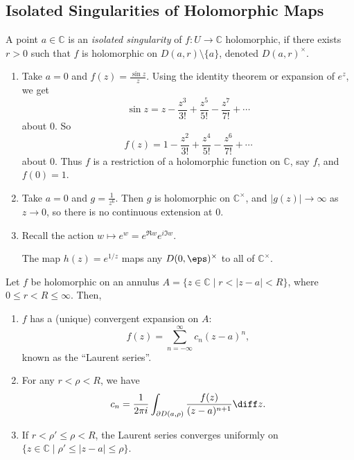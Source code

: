 \documentclass[12pt]{article}
\begin{document}
\subsection{Isolated Singularities of Holomorphic Maps}
\label{sub:isolated_singularities_of_holomorphic_maps}

\begin{definition}
	A point $a \in \mathbb{C}$ is an \emph{isolated singularity} of $f : U \to \mathbb{C}$ holomorphic, if there exists $r > 0$ such that $f$ is holomorphic on $D(a, r) \setminus \{a\}$, denoted $D(a, r)^{\times}$.
\end{definition}

\begin{exbox}
	\begin{enumerate}
		\item Take $a = 0$ and $f(z) = \frac{\sin z}{z}$. Using the identity theorem or expansion of $e^{z}$, we get
			\[
				\sin z = z - \frac{z^3}{3!} + \frac{z^{5}}{5!} - \frac{z^{7}}{7!} + \cdots
			\]
			about $0$. So
			\[
			f(z) = 1 - \frac{z^2}{3!} + \frac{z^4}{5!} - \frac{z^6}{7!} + \cdots
			\]
			about $0$. Thus $f$ is a restriction of a holomorphic function on $\mathbb{C}$, say $f$, and $f(0) = 1$.
		\item Take $a=  0$ and $g = \frac{1}{z^{6}}$. Then $g$ is holomorphic on $\mathbb{C}^{\times}$, and $|g(z)| \to \infty$ as $z \to 0$, so there is no continuous extension at $0$.
		\item Recall the action $w \mapsto e^{w} = e^{\Re w} e^{i \Im w}$.

			The map $h(z) = e^{1/z}$ maps any $D(0, \eps)^{\times}$ to all of $\mathbb{C}^\times$.
	\end{enumerate}
\end{exbox}


\begin{theorem}
	Let $f$ be holomorphic on an annulus $A = \{z \in \mathbb{C} \mid r < |z - a| < R\}$, where $0 \leq r < R \leq \infty$. Then,
	\begin{enumerate}[\normalfont(i)]
		\item $f$ has a (unique) convergent expansion on $A$:
			\[
			f(z) = \sum_{n = -\infty}^{\infty} c_n(z - a)^{n},
			\]
			known as the ``Laurent series''.
		\item For any $r < \rho < R$, we have
			\[
			c_n = \frac{1}{2 \pi i} \int_{\partial D(a, \rho)} \frac{f(z)}{(z - a)^{n+1}} \diff z.
			\]
		\item If $r < \rho' \leq \rho < R$, the Laurent series converges uniformly on $\{z \in \mathbb{C} \mid \rho' \leq |z - a| \leq \rho\}$.
	\end{enumerate}
\end{theorem}
\end{document}
